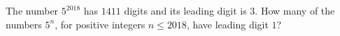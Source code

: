 The number $5^{2018}$ has $1411$ digits and its leading digit is $3$. How many of the numbers $5^n$, for positive integers $n\le2018$, have leading digit $1$?
